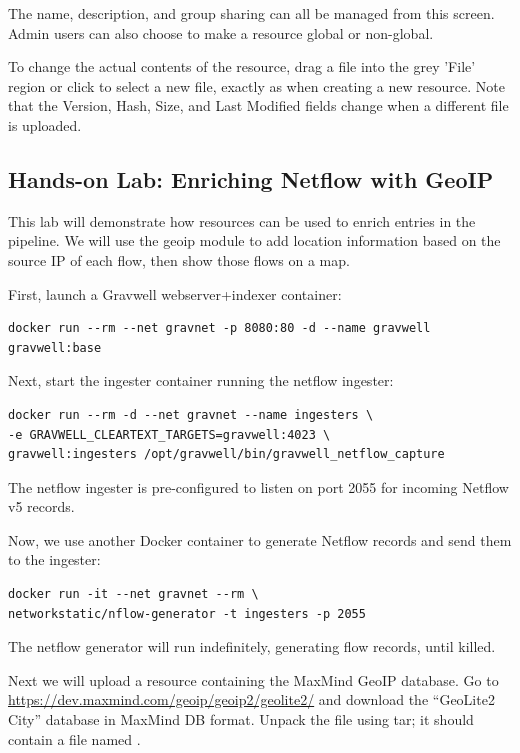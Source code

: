 The name, description, and group sharing can all be managed from this
screen. Admin users can also choose to make a resource global or
non-global.

To change the actual contents of the resource, drag a file into the
grey 'File' region or click to select a new file, exactly as when
creating a new resource. Note that the Version, Hash, Size, and Last
Modified fields change when a different file is uploaded.

\clearpage
\subsection{Hands-on Lab: Enriching Netflow with GeoIP}

This lab will demonstrate how resources can be used to enrich entries
in the pipeline. We will use the geoip module to add location
information based on the source IP of each flow, then show those flows
on a map.

First, launch a Gravwell webserver+indexer container:

\begin{Verbatim}[breaklines=true]
docker run --rm --net gravnet -p 8080:80 -d --name gravwell gravwell:base
\end{Verbatim}

Next, start the ingester container running the netflow ingester:

\begin{Verbatim}[breaklines=true]
docker run --rm -d --net gravnet --name ingesters \
-e GRAVWELL_CLEARTEXT_TARGETS=gravwell:4023 \
gravwell:ingesters /opt/gravwell/bin/gravwell_netflow_capture
\end{Verbatim}

The netflow ingester is pre-configured to listen on port 2055 for
incoming Netflow v5 records.

Now, we use another Docker container to generate Netflow records and
send them to the ingester:

\begin{Verbatim}[breaklines=true]
docker run -it --net gravnet --rm \
networkstatic/nflow-generator -t ingesters -p 2055
\end{Verbatim}

The netflow generator will run indefinitely, generating flow records,
until killed.

Next we will upload a resource containing the MaxMind GeoIP database.
Go to
\href{https://dev.maxmind.com/geoip/geoip2/geolite2}{https://dev.maxmind.com/geoip/geoip2/geolite2/} and
download the ``GeoLite2 City'' database in MaxMind DB format. Unpack the file
using tar; it should contain a file named .

